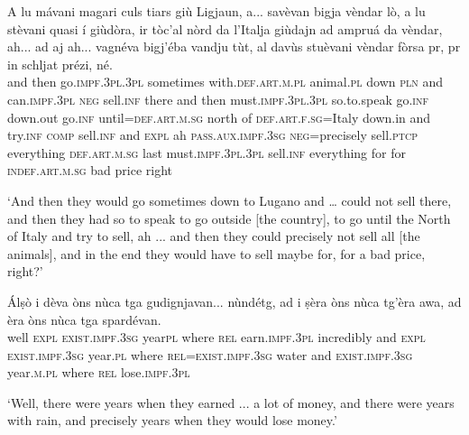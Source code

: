 \begin{linenumbers}
\gll A lu mávani magari culs tiars giù Ligjaun, a... savèvan bigja vèndar lò, a lu stèvani quasi í giùdòra, ir tòc’al nòrd da l’Italja giùdajn ad ampruá da vèndar, ah... ad aj ah... vagnéva bigj’éba vandju tùt, al davùs stuèvani vèndar fòrsa pr, pr in schljat prézi, né.\\
  and then go.\textsc{impf.3pl.3pl} sometimes with.\textsc{def.art.m.pl} animal.\textsc{pl} down \textsc{pln} and can.\textsc{impf.3pl} \textsc{neg} sell.\textsc{inf} there and then must.\textsc{impf.3pl.3pl} so.to.speak go.\textsc{inf} down.out go.\textsc{inf} until=\textsc{def.art.m.sg} north of \textsc{def.art.f.sg}=Italy down.in and try.\textsc{inf} \textsc{comp} sell.\textsc{inf} and \textsc{expl} ah \textsc{pass.aux.impf.3sg} \textsc{neg}=precisely sell.\textsc{ptcp} everything \textsc{def.art.m.sg} last must.\textsc{impf.3pl.3pl} sell.\textsc{inf} everything for for \textsc{indef.art.m.sg} bad price right \\
\end{linenumbers}
\medskip
\glt `And then they would go sometimes down to Lugano and … could not sell there, and then they had so to speak to go outside [the country], to go until the North of Italy and try to sell, ah ... and then they could precisely not sell all [the animals], and in the end they would have to sell maybe for, for a bad price, right?'
\medskip

\begin{linenumbers}
\gll Álṣò i dèva òns nùca tga gudignjavan... nùndétg, ad i ṣèra òns nùca tg’èra awa, ad èra òns nùca tga spardévan.\\
well \textsc{expl} \textsc{exist.impf.3sg} year\textsc{pl} where \textsc{rel} earn.\textsc{impf.3pl} incredibly and \textsc{expl} \textsc{exist.impf.3sg} year.\textsc{pl} where \textsc{rel}=\textsc{exist.impf.3sg} water and \textsc{exist.impf.3sg} year.\textsc{m.pl} where \textsc{rel} lose.\textsc{impf.3pl} \\
\end{linenumbers}
\medskip
\glt `Well, there were years when they earned ... a lot of money, and there were years with rain, and precisely years when they would lose money.'
\medskip

